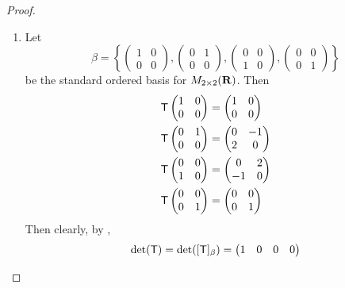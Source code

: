 \begin{proof}
\begin{enumerate}
\item Let
\[
    \beta = \left\{
        \begin{pmatrix} 1 & 0 \\ 0 & 0 \end{pmatrix},
        \begin{pmatrix} 0 & 1 \\ 0 & 0 \end{pmatrix},
        \begin{pmatrix} 0 & 0 \\ 1 & 0 \end{pmatrix},
        \begin{pmatrix} 0 & 0 \\ 0 & 1 \end{pmatrix}
    \right\}
\]
be the standard ordered basis for \(M_{2 \times 2}(\mathbf{R})\).
Then
\begin{align*}
    \textsf{T} \begin{pmatrix} 1 & 0 \\ 0 & 0 \end{pmatrix} & = \begin{pmatrix} 1 & 0 \\ 0 & 0 \end{pmatrix} \\
    \textsf{T} \begin{pmatrix} 0 & 1 \\ 0 & 0 \end{pmatrix} & = \begin{pmatrix} 0 & -1 \\ 2 & 0 \end{pmatrix} \\
    \textsf{T} \begin{pmatrix} 0 & 0 \\ 1 & 0 \end{pmatrix} & = \begin{pmatrix} 0 & 2 \\ -1 & 0 \end{pmatrix} \\
    \textsf{T} \begin{pmatrix} 0 & 0 \\ 0 & 1 \end{pmatrix} & = \begin{pmatrix} 0 & 0 \\ 0 & 1 \end{pmatrix}
\end{align*}
Then clearly, by ,
\[
    \det(\textsf{T}) = \det([\textsf{T}]_{\beta}) = \begin{pmatrix}
        1 & 0 & 0 & 0 \\

\end{pmatrix}\]
\end{enumerate}
\end{proof}
